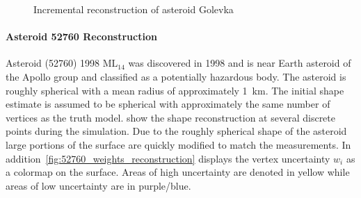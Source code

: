 \documentclass[journal]{new-aiaa}
\begin{document}
\begin{figure}[htbp]
    \caption[Asteroid Golevka incremental reconstruction]{Incremental reconstruction of asteroid Golevka~\label{fig:golevka_reconstruction}}
\end{figure}
\paragraph{Asteroid 52760 Reconstruction}

Asteroid (\num{52760}) \num{1998} \(\text{ML}_{14}\) was discovered in \num{1998} and is near Earth asteroid of the Apollo group and classified as a potentially hazardous body.
The asteroid is roughly spherical with a mean radius of approximately \SI{1}{\kilo\meter}.
The initial shape estimate is assumed to be spherical with approximately the same number of vertices as the truth model.
 show the shape reconstruction at several discrete points during the simulation.
Due to the roughly spherical shape of the asteroid large portions of the surface are quickly modified to match the measurements.
In addition~\cref{fig:52760_weights_reconstruction} displays the vertex uncertainty \( w_i \) as a colormap on the surface. 
Areas of high uncertainty are denoted in yellow while areas of low uncertainty are in purple/blue.
\end{document}

